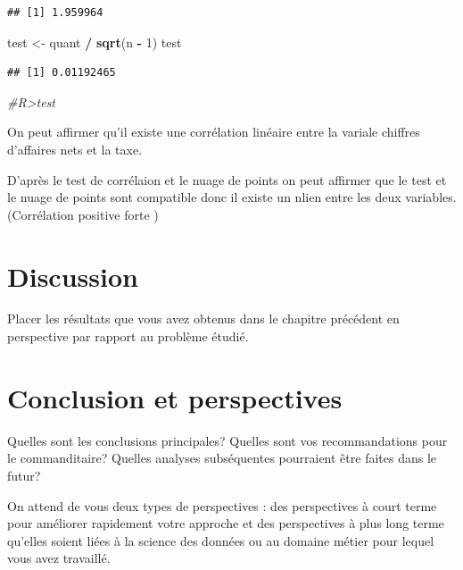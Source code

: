 \documentclass[mstat,12pt]{unswthesis}
\newenvironment{Shaded}{\begin{snugshade}}{\end{snugshade}}
\newcommand{\CommentTok}[1]{\textcolor[rgb]{0.56,0.35,0.01}{\textit{#1}}}
\newcommand{\DecValTok}[1]{\textcolor[rgb]{0.00,0.00,0.81}{#1}}
\newcommand{\FunctionTok}[1]{\textcolor[rgb]{0.13,0.29,0.53}{\textbf{#1}}}
\newcommand{\NormalTok}[1]{#1}
\newcommand{\OtherTok}[1]{\textcolor[rgb]{0.56,0.35,0.01}{#1}}
\newcommand{\SpecialCharTok}[1]{\textcolor[rgb]{0.81,0.36,0.00}{\textbf{#1}}}
\begin{document}
\begin{verbatim}
## [1] 1.959964
\end{verbatim}

\begin{Shaded}
\begin{Highlighting}[]
\NormalTok{test }\OtherTok{\textless{}{-}}\NormalTok{ quant }\SpecialCharTok{/} \FunctionTok{sqrt}\NormalTok{(n }\SpecialCharTok{{-}} \DecValTok{1}\NormalTok{)}
\NormalTok{test}
\end{Highlighting}
\end{Shaded}

\begin{verbatim}
## [1] 0.01192465
\end{verbatim}

\begin{Shaded}
\begin{Highlighting}[]
\CommentTok{\#R\textgreater{}test}
\end{Highlighting}
\end{Shaded}

\medskip

On peut affirmer qu'il existe une corrélation linéaire entre la variale
chiffres d'affaires nets et la taxe.

D'après le test de corrélaion et le nuage de points on peut affirmer que
le test et le nuage de points sont compatible donc il existe un nlien
entre les deux variables.(Corrélation positive forte )

\chapter{Discussion}\label{discussion}

Placer les résultats que vous avez obtenus dans le chapitre précédent en
perspective par rapport au problème étudié.

\chapter{Conclusion et perspectives}\label{conclusion-et-perspectives}

Quelles sont les conclusions principales? Quelles sont vos
recommandations pour le commanditaire? Quelles analyses subséquentes
pourraient être faites dans le futur?

\bigskip

On attend de vous deux types de perspectives : des perspectives à court
terme pour améliorer rapidement votre approche et des perspectives à
plus long terme qu'elles soient liées à la science des données ou au
domaine métier pour lequel vous avez travaillé.
\end{document}
